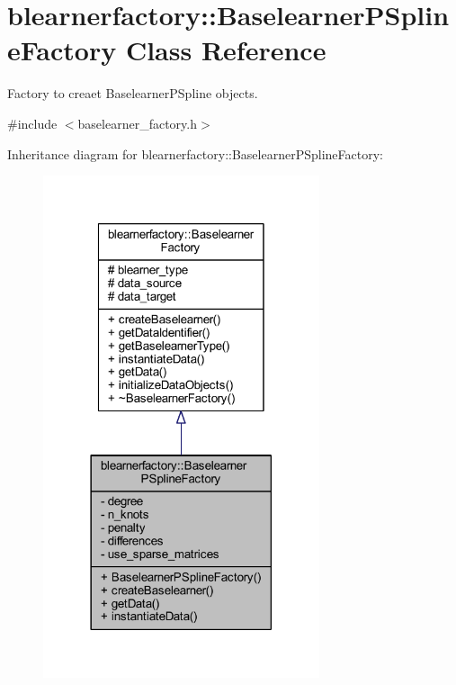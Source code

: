 \hypertarget{classblearnerfactory_1_1_baselearner_p_spline_factory}{}\section{blearnerfactory\+:\+:Baselearner\+P\+Spline\+Factory Class Reference}
\label{classblearnerfactory_1_1_baselearner_p_spline_factory}


Factory to creaet {\ttfamily Baselearner\+P\+Spline} objects.  




{\ttfamily \#include $<$baselearner\+\_\+factory.\+h$>$}



Inheritance diagram for blearnerfactory\+:\+:Baselearner\+P\+Spline\+Factory\+:
\nopagebreak
\begin{figure}[H]
\begin{center}
\leavevmode
\includegraphics[width=230pt]{classblearnerfactory_1_1_baselearner_p_spline_factory__inherit__graph}
\end{center}
\end{figure}


